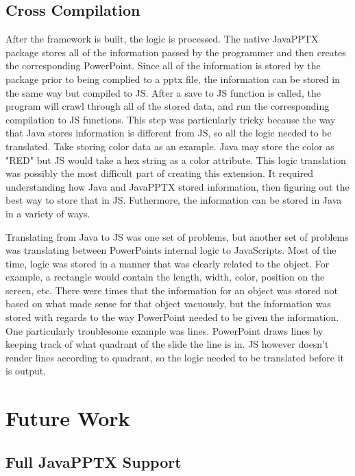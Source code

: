 \documentclass[12pt,twoside]{reedthesis}
\begin{document}
\subsection{Cross Compilation}
After the framework is built, the logic is processed. The native JavaPPTX package stores all of the information passed by the programmer and then creates the corresponding PowerPoint. Since all of the information is stored by the package prior to being complied to a pptx file, the information can be stored in the same way but compiled to JS. After a save to JS function is called, the program will crawl through all of the stored data, and run the corresponding compilation to JS functions. This step was particularly tricky because the way that Java stores information is different from JS, so all the logic needed to be translated. Take storing color data as an example. Java may store the color as "RED" but JS would take a hex string as a color attribute. This logic translation was possibly the most difficult part of creating this extension. It required understanding how Java and  JavaPPTX stored information, then figuring out the best way to store that in JS. Futhermore, the information can be stored in Java in a variety of ways. 

Translating from Java to JS was one set of problems, but another set of problems was translating between PowerPoints internal logic to JavaScripts. Most of the time, logic was stored in a manner that was clearly related to the object. For example, a rectangle would contain the length, width, color, position on the screen, etc. There were times that the information for an object was stored not based on what made sense for that object vacuously, but the information was stored with regards to the way PowerPoint needed to be given the information. One particularly troublesome example was lines. PowerPoint draws lines by keeping track of what quadrant of the slide the line is in. JS however doesn't render lines according to quadrant, so the logic needed to be translated before it is output. 

\section{Future Work}

\subsection{Full JavaPPTX Support} 
\end{document}
